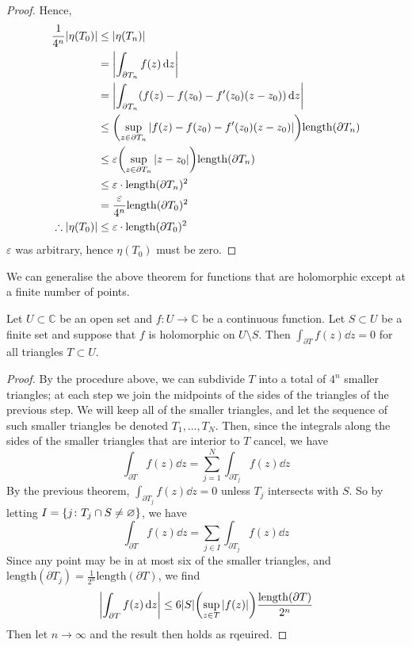 \begin{proof}
	Hence,
	\begin{align*}
		\frac{1}{4^n} \abs{\eta(T_0)} &\leq \abs{\eta(T_n)} \\
		&= \abs{\int_{\partial T_n} f(z) \dd{z}} \\
		&= \abs{\int_{\partial T_n} (f(z) - f(z_0) - f'(z_0)(z - z_0)) \dd{z}} \\
		&\leq \qty(\sup_{z \in \partial T_n} \abs{f(z) - f(z_0) - f'(z_0)(z-z_0)}) \mathrm{length}(\partial T_n) \\
		&\leq \varepsilon \qty(\sup_{z \in \partial T_n} \abs{z - z_0}) \mathrm{length}(\partial T_n) \\
		&\leq \varepsilon \cdot \mathrm{length}(\partial T_n)^2 \\
		&= \frac{\varepsilon}{4^n} \mathrm{length}(\partial T_0)^2 \\
		\therefore \abs{\eta(T_0)} &\leq \varepsilon \cdot \mathrm{length}(\partial T_0)^2
	\end{align*}
	\( \varepsilon \) was arbitrary, hence \( \eta(T_0) \) must be zero.
\end{proof}
We can generalise the above theorem for functions that are holomorphic except at a finite number of points.
\begin{theorem}
	Let \( U \subset \mathbb C \) be an open set and \( f \colon U \to \mathbb C \) be a continuous function.
	Let \( S \subset U \) be a finite set and suppose that \( f \) is holomorphic on \( U \setminus S \).
	Then \( \int_{\partial T} f(z) \dd{z} = 0 \) for all triangles \( T \subset U \).
\end{theorem}
\begin{proof}
	By the procedure above, we can subdivide \( T \) into a total of \( 4^n \) smaller triangles; at each step we join the midpoints of the sides of the triangles of the previous step.
	We will keep all of the smaller triangles, and let the sequence of such smaller triangles be denoted \( T_1, \dots, T_N \).
	Then, since the integrals along the sides of the smaller triangles that are interior to \( T \) cancel, we have
	\[ \int_{\partial T} f(z) \dd{z} = \sum_{j=1}^N \int_{\partial T_j} f(z) \dd{z} \]
	By the previous theorem, \( \int_{\partial T_j} f(z) \dd{z} = 0 \) unless \( T_j \) intersects with \( S \).
	So by letting \( I = \qty{j \colon T_j \cap S \neq \varnothing} \), we have
	\[ \int_{\partial T} f(z) \dd{z} = \sum_{j \in I} \int_{\partial T_j} f(z) \dd{z} \]
	Since any point may be in at most six of the smaller triangles, and \( \mathrm{length}(\partial T_j) = \frac{1}{2^n} \mathrm{length}(\partial T) \), we find
	\[ \abs{\int_{\partial T} f(z) \dd{z}} \leq 6\abs{S} \qty(\sup_{z \in T} \abs{f(z)}) \frac{\mathrm{length}(\partial T)}{2^n} \]
	Then let \( n \to \infty \) and the result then holds as rqeuired.
\end{proof}
